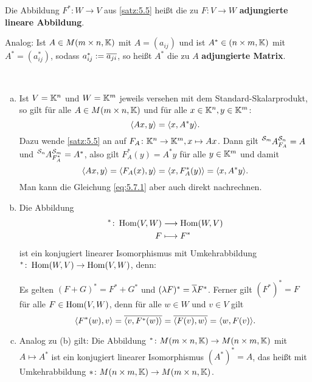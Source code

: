 \begin{definition}[Adjungierte]
	\label{def:5.6}
	Die Abbildung $F^*\colon W \rightarrow V$ aus \autoref{satz:5.5} heißt die zu $F \colon V \rightarrow W$ \textbf{adjungierte lineare Abbildung}.
	
	Analog: Ist $A \in M(m \times n, \mathbb{K})$ mit $A = (a_{ij})$ und ist $A^* \in (n \times m, \mathbb{K})$ mit $A^* = (a^*_{ij})$, sodass $a^*_{ij} := \overline{a_{ji}}$, so heißt $A^*$ die zu $A$ \textbf{adjungierte Matrix}. 
\end{definition}

\begin{bemerkung}
	\label{bem:5.7}
	\mbox{} \\[-1.4cm]
	\begin{enumerate}[(a)]
		\item Ist $V = \mathbb{K}^n$ und $W = \mathbb{K}^m$ jeweils versehen mit dem Standard-Skalarprodukt, so gilt für alle $A \in M(m \times n,\mathbb{K})$ und für alle $x \in \mathbb{K}^n, y \in \mathbb{K}^m$:
		\begin{equation}
			\sk{Ax,y} = \sk{x,A^*y}. \label{eq:5.7.1}
		\end{equation}
		Dazu wende \autoref{satz:5.5} an auf $F_A \colon \mathbb{K}^n \rightarrow \mathbb{K}^m, x \mapsto Ax$.
		Dann gilt $\mat{A}{\mathcal{S}_m}{\mathcal{S}_n}{F_A} =A$ und $\mat{A}{\mathcal{S}_n}{\mathcal{S}_m}{F_A^*} = A^*$, also gilt $F_A^*(y) = A^*y$ für alle $y \in \mathbb{K}^m$ und damit
		\[
			\sk{Ax,y} = \sk{F_A(x),y} = \sk{x,F_A^*(y)} = \sk{x,A^*y}.
		\]
		Man kann die Gleichung \eqref{eq:5.7.1} aber auch direkt nachrechnen.
		\item Die Abbildung
		\begin{align*}
			^*\colon \operatorname{Hom}(V,W) &\longrightarrow \operatorname{Hom}(W,V) \\
			F &\longmapsto F^*
		\end{align*}
		ist ein konjugiert linearer Isomorphismus mit Umkehrabbildung $^*\colon \operatorname{Hom}(W,V) \rightarrow \operatorname{Hom}(V,W)$, denn:
		
		Es gelten $(F+G)^* = F^* + G^*$ und $(\lambda F)^* = \overline{\lambda} F^*$.
		Ferner gilt $(F^*)^* = F$ für alle $F \in \operatorname{Hom}(V,W)$, denn für alle $w \in W$ und $v \in V$ gilt
		\[
			\sk{F^*(w),v} = \ol{\sk{v,F^*(w)}} = \ol{\sk{F(v),w}} = \sk{w,F(v)}.
		\]
		\item Analog zu (b) gilt:
		Die Abbildung $^*\colon M(m \times n, \mathbb{K}) \rightarrow M(n \times m, \mathbb{K})$ mit $A \mapsto A^*$ ist ein konjugiert linearer Isomorphismus $(A^*)^* = A$, das heißt mit Umkehrabbildung $*\colon M(n \times m, \mathbb{K}) \rightarrow M(m \times n, \mathbb{K})$.
	\end{enumerate}
\end{bemerkung}

